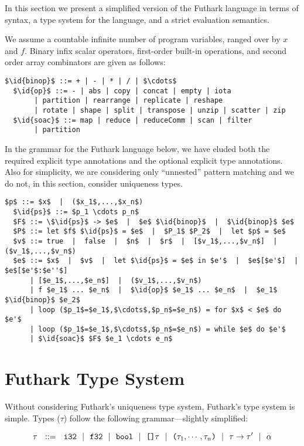 \documentclass[oneside,11pt]{book}
\begin{document}
In this section we present a simplified version of the Futhark
language in terms of syntax, a type system for the language, and a
strict evaluation semantics.

We assume a countable infinite number of program variables, ranged over
by $x$ and $f$. Binary infix scalar operators, first-order built-in operations, and
second order array combinators are given as follows:

\begin{lstlisting}[mathescape=true,style=nonumbers]
  $\id{binop}$ ::= + | - | * | / | $\cdots$
  $\id{op}$ ::= - | abs | copy | concat | empty | iota
       | partition | rearrange | replicate | reshape
       | rotate | shape | split | transpose | unzip | scatter | zip
  $\id{soac}$ ::= map | reduce | reduceComm | scan | filter
       | partition
\end{lstlisting}

In the grammar for the Futhark language below, we have eluded both the
required explicit type annotations and the optional explicit type
annotations. Also for simplicity, we are considering only ``unnested''
pattern matching and we do not, in this section, consider uniqueness types.

\begin{lstlisting}[mathescape=true,style=nonumbers]
  $p$ ::= $x$  |  ($x_1$,...,$x_n$)
  $\id{ps}$ ::= $p_1 \cdots p_n$
  $F$ ::= \$\id{ps}$ -> $e$  |  $e$ $\id{binop}$  |  $\id{binop}$ $e$
  $P$ ::= let $f$ $\id{ps}$ = $e$  |  $P_1$ $P_2$  |  let $p$ = $e$
  $v$ ::= true  |  false  |  $n$  |  $r$  |  [$v_1$,...,$v_n$]  |  ($v_1$,...,$v_n$)
  $e$ ::= $x$  |  $v$  |  let $\id{ps}$ = $e$ in $e'$  |  $e$[$e'$]  |  $e$[$e'$:$e''$]
      | [$e_1$,...,$e_n$]  |  ($v_1$,...,$v_n$)
      | f $e_1$ ... $e_n$  |  $\id{op}$ $e_1$ ... $e_n$  |  $e_1$ $\id{binop}$ $e_2$
      | loop ($p_1$=$e_1$,$\cdots$,$p_n$=$e_n$) = for $x$ < $e$ do $e'$
      | loop ($p_1$=$e_1$,$\cdots$,$p_n$=$e_n$) = while $e$ do $e'$
      | $\id{soac}$ $F$ $e_1 \cdots e_n$
\end{lstlisting}

\section{Futhark Type System}
Without considering Futhark's uniqueness type system, Futhark's type system is simple. Types ($\tau$) follow the following grammar---slightly simplified:

$$\tau ~~::=~~ \texttt{i32} ~~|~~ \texttt{f32} ~~|~~ \texttt{bool} ~~|~~ \texttt{[]}\tau ~~|~~ \texttt{(}\tau_1,\cdots,\tau_n\texttt{)} ~~|~~ \tau \rightarrow \tau' ~~|~~ \alpha$$
\end{document}
